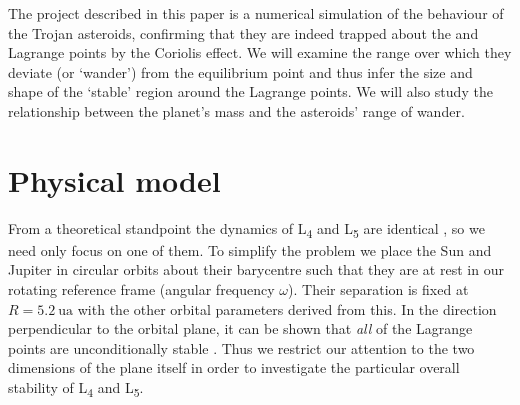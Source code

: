 \documentclass[a4paper]{article}
\begin{document}
    The project described in this paper is a numerical simulation of the
    behaviour of the Trojan asteroids, confirming that they are indeed trapped
    about the  and  Lagrange points by the Coriolis effect. We
    will examine the range over which they deviate (or `wander') from the
    equilibrium point and thus infer the size and shape of the `stable' region
    around the Lagrange points.  We will also study the relationship between
    the planet's mass and the asteroids' range of wander.

  \section{Physical model}

    From a theoretical standpoint the dynamics of L\textsubscript{4} and
    L\textsubscript{5} are identical \cite{marzari}, so we need only focus on
    one of them. To simplify the problem we place the Sun and Jupiter in
    circular orbits about their barycentre such that they are at rest in our
    rotating reference frame (angular frequency $\omega$). Their separation is
    fixed at $R=\SI{5.2}{\astronomicalunit}$ with the other orbital parameters
    derived from this. In the direction perpendicular to the orbital plane, it
    can be shown that \emph{all} of the Lagrange points are unconditionally
    stable \cite{greenspan}.  Thus we restrict our attention to the two
    dimensions of the plane itself in order to investigate the particular
    overall stability of L\textsubscript{4} and L\textsubscript{5}.
\end{document}
